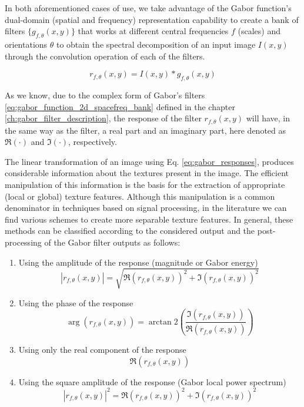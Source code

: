 In both aforementioned cases of use, we take advantage of the Gabor function's dual-domain (spatial and frequency) representation capability to create a bank of filters $\{g_{f, \theta}(x, y) \}$ that works at different central frequencies $f$ (scales) and orientations $\theta$ to obtain the spectral decomposition of an input image $I(x, y)$ through the convolution operation of each of the filters. 

\begin{equation}\label{eq:gabor_responses}
    r_{f, \theta}(x,y) = I(x, y) \ast g_{f, \theta}(x,y)
\end{equation}

As we know, due to the complex form of Gabor's filters \ref{eq:gabor_function_2d_spacefreq_bank} defined in the chapter \ref{ch:gabor_filter_description}, the response of the filter $r_{f,\theta} (x, y)$ will have, in the same way as the filter, a real part and an imaginary part, here denoted as $\Re{(\cdot)}$ and $\Im{(\cdot)}$, respectively.

The linear transformation of an image using Eq. \eqref{eq:gabor_responses}, produces considerable information about the textures present in the image. The efficient manipulation of this information is the basis for the extraction of appropriate (local or global) texture features. Although this manipulation is a common denominator in techniques based on signal processing, in the literature we can find various schemes to create more separable texture features. In general, these methods can be classified according to the considered output and the post-processing of the Gabor filter outputs as follows: 

\begin{enumerate}
    \item Using the amplitude of the response (magnitude or Gabor energy) \cite{Bovik.Clark.ea:TPAMI:1990}
        \begin{equation}\label{eq:gabor_magnitude}
            |r_{f, \theta}(x,y)| = \sqrt{\Re{(r_{f, \theta}(x, y))}^2 + \Im{(r_{f, \theta}(x, y))}^2}
        \end{equation}
    \item Using the phase of the response \cite{Palm.Lehmann:MGV:2002}
    \begin{equation}\label{eq:gabor_phase}
            \arg(r_{f, \theta}(x,y)) = \arctan2{\left(\frac{\Im{(r_{f, \theta}(x, y))}}{\Re{(r_{f, \theta}(x, y))}}\right)}
        \end{equation}
    \item Using only the real component of the response \cite{Jain.Farrokhnia:IJPR:1991}
    \begin{equation}\label{eq:gabor_real_part}
            \Re{(r_{f, \theta}(x, y))}
        \end{equation}
    \item Using the square amplitude of the response (Gabor local power spectrum) \cite{Grigorescu.Petkov.ea:TIP:2002}
    \begin{equation}\label{eq:gabor_power}
            |r_{f, \theta}(x,y)|^2 = \Re{(r_{f, \theta}(x, y))}^2 + \Im{(r_{f, \theta}(x, y))}^2
        \end{equation}
\end{enumerate}

